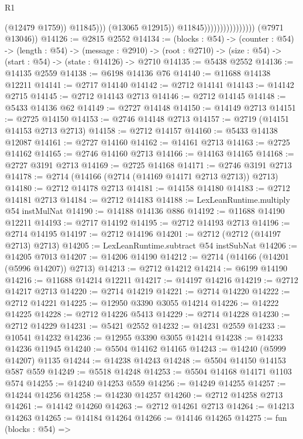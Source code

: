 \begin{lexlean}{R1}
\begin{coremodule}
                                                (@12479 @1759))
                                              @11845)))
                                        (@13065 @12915))
                                      @11845))))))))))))))))
      (@7971 @13046))
@14126 := @2815 @2552
@14134 := (blocks : @54) ->
  (counter : @54) ->
  (length : @54) ->
  (message : @2910) -> (root : @2710) -> (size : @54) -> (start : @54) -> (state : @14126) -> @2710
@14135 := @5438 @2552
@14136 := @14135 @2559
@14138 := @6198 @14136 @76
@14140 := @11688 @14138 @12211
@14141 := @2717 @14140
@14142 := @2712 @14141
@14143 := @14142 @2715
@14145 := @2712 @14143 @2713
@14146 := @2712 @14145
@14148 := @5433 @14136 @62
@14149 := @2727 @14148
@14150 := @14149 @2713
@14151 := @2725 @14150
@14153 := @2746 @14148 @2713
@14157 := @2719 (@14151 @14153 @2713 @2713)
@14158 := @2712 @14157
@14160 := @5433 @14138 @12087
@14161 := @2727 @14160
@14162 := @14161 @2713
@14163 := @2725 @14162
@14165 := @2746 @14160 @2713
@14166 := @14163 @14165
@14168 := @2727 @3191 @2713
@14169 := @2725 @14168
@14171 := @2746 @3191 @2713
@14178 := @2714 (@14166 (@2714 (@14169 @14171 @2713 @2713)) @2713)
@14180 := @2712 @14178 @2713
@14181 := @14158 @14180
@14183 := @2712 @14181 @2713
@14184 := @2712 @14183
@14188 := LexLeanRuntime.multiply @54 instMulNat
@14190 := @14188 @14136 @886
@14192 := @11688 @14190 @12211
@14193 := @2717 @14192
@14195 := @2712 @14193 @2713
@14196 := @2714 @14195
@14197 := @2712 @14196
@14201 := @2712 (@2712 (@14197 @2713) @2713)
@14205 := LexLeanRuntime.subtract @54 instSubNat
@14206 := @14205 @7013
@14207 := @14206 @14190
@14212 := @2714 (@14166 (@14201 (@5996 @14207)) @2713)
@14213 := @2712 @14212
@14214 := @6199 @14190
@14216 := @11688 @14214 @12211
@14217 := @14197 @14216
@14219 := @2712 @14217 @2713
@14220 := @2714 @14219
@14221 := @2714 @14220
@14222 := @2712 @14221
@14225 := @12950 @3390 @3055 @14214
@14226 := @14222 @14225
@14228 := @2712 @14226 @5413
@14229 := @2714 @14228
@14230 := @2712 @14229
@14231 := @5421 @2552
@14232 := @14231 @2559
@14233 := @10541 @14232
@14236 := @12955 @3390 @3055 @14214
@14238 := @14233 @14236 @11945
@14240 := @5504 @14162 @14165
@14243 := @14240 (@5999 @14207) @1135
@14244 := @14238 @14243
@14248 := @5504 @14150 @14153 @587 @559
@14249 := @5518 @14248
@14253 := @5504 @14168 @14171 @1103 @574
@14255 := @14240 @14253 @559
@14256 := @14249 @14255
@14257 := @14244 @14256
@14258 := @14230 @14257
@14260 := @2712 @14258 @2713
@14261 := @14142 @14260
@14263 := @2712 @14261 @2713
@14264 := @14213 @14263
@14265 := @14184 @14264
@14266 := @14146 @14265
@14275 := fun (blocks : @54) =>

\end{coremodule}
\end{lexlean}
